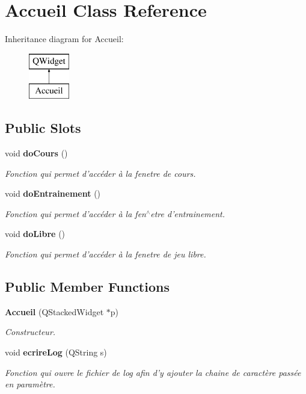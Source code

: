 \section{Accueil Class Reference}
\label{class_accueil}
Inheritance diagram for Accueil\-:\begin{figure}[H]
\begin{center}
\leavevmode
\includegraphics[height=2.000000cm]{class_accueil}
\end{center}
\end{figure}
\subsection*{Public Slots}
\begin{DoxyCompactItemize}
\item 
void {\bf do\-Cours} ()
\begin{DoxyCompactList}\small\item\em Fonction qui permet d'accéder à la fenetre de cours. \end{DoxyCompactList}\item 
void {\bf do\-Entrainement} ()
\begin{DoxyCompactList}\small\item\em Fonction qui permet d'accéder à la fen$^\wedge$etre d'entrainement. \end{DoxyCompactList}\item 
void {\bf do\-Libre} ()
\begin{DoxyCompactList}\small\item\em Fonction qui permet d'accéder à la fenetre de jeu libre. \end{DoxyCompactList}\end{DoxyCompactItemize}
\subsection*{Public Member Functions}
\begin{DoxyCompactItemize}
\item 
{\bf Accueil} (Q\-Stacked\-Widget $\ast$p)
\begin{DoxyCompactList}\small\item\em Constructeur. \end{DoxyCompactList}\item 
void {\bf ecrire\-Log} (Q\-String s)
\begin{DoxyCompactList}\small\item\em Fonction qui ouvre le fichier de log afin d'y ajouter la chaine de caractère passée en paramètre. \end{DoxyCompactList}\end{DoxyCompactItemize}



